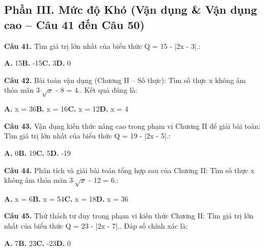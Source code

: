 \documentclass[11pt,a4paper]{article}
\begin{document}
\subsection*{\color{accent} Phần III. Mức độ Khó (Vận dụng \& Vận dụng cao -- Câu 41 đến Câu 50)}
\textbf{\color{primary} Câu 41.} Tìm giá trị lớn nhất của biểu thức Q = 15 - |2x - 3|.:\par
\hspace*{1.5em}\textbf{A.} 15\quad\quad \textbf{B.} -15\quad\quad \textbf{C.} 3\quad\quad \textbf{D.} 0\par\vspace{2pt}
\textbf{\color{primary} Câu 42.} Bài toán vận dụng (Chương II – Số thực): Tìm số thực x không âm thỏa mãn 3$\cdot$$\sqrt{x}$ - 8 = 4.. Kết quả đúng là:\par
\hspace*{1.5em}\textbf{A.} x = 36\quad\quad \textbf{B.} x = 16\quad\quad \textbf{C.} x = 12\quad\quad \textbf{D.} x = 4\par\vspace{2pt}
\textbf{\color{primary} Câu 43.} Vận dụng kiến thức nâng cao trong phạm vi Chương II để giải bài toán: Tìm giá trị lớn nhất của biểu thức Q = 19 - |2x - 5|.:\par
\hspace*{1.5em}\textbf{A.} 0\quad\quad \textbf{B.} 19\quad\quad \textbf{C.} 5\quad\quad \textbf{D.} -19\par\vspace{2pt}
\textbf{\color{primary} Câu 44.} Phân tích và giải bài toán tổng hợp sau của Chương II: Tìm số thực x không âm thỏa mãn 3$\cdot$$\sqrt{x}$ - 12 = 6.:\par
\hspace*{1.5em}\textbf{A.} x = 6\quad\quad \textbf{B.} x = 54\quad\quad \textbf{C.} x = 18\quad\quad \textbf{D.} x = 36\par\vspace{2pt}
\textbf{\color{primary} Câu 45.} Thử thách tư duy trong phạm vi kiến thức Chương II: Tìm giá trị lớn nhất của biểu thức Q = 23 - |2x - 7|.. Đáp số chính xác là:\par
\hspace*{1.5em}\textbf{A.} 7\quad\quad \textbf{B.} 23\quad\quad \textbf{C.} -23\quad\quad \textbf{D.} 0\par\vspace{2pt}
\end{document}
